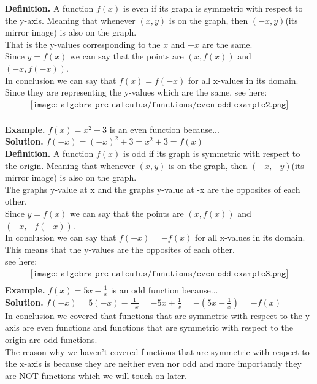 \textbf{Definition.} A function $f(x)$ is even if its graph is symmetric with respect to the y-axis. Meaning that whenever $(x,y)$ is on the graph, then $(-x,y)$(its mirror image) is also on the graph. \\
That is the y-values corresponding to the $x$ and $-x$ are the same. \\
Since $y = f(x)$ we can say that the points are $(x,f(x))$ and $(-x,f(-x))$. \\
In conclusion  we can say that $f(x) = f(-x)$ for all x-values in its domain. Since they are representing the y-values which are the same. 
see here: 
\begin{align*}
	\texttt{[image: algebra-pre-calculus/functions/even\_odd\_example2.png]} \\
\end{align*}

\textbf{Example.} $f(x) = x^2+3$ is an even function because... \\
\textbf{Solution.} $f(-x) = (-x)^2+3 = x^2+3 = f(x)$ \\

\textbf{Definition.} A function $f(x)$ is odd if its graph is symmetric with respect to the origin. Meaning that whenever $(x,y)$ is on the graph, then $(-x,-y)$(its mirror image) is also on the graph. \\
The graphs y-value at x and the graphs y-value at -x are the opposites of each other. \\
Since $y = f(x)$ we can say that the points are $(x,f(x))$ and $(-x,-f(-x))$. \\
In conclusion  we can say that $f(-x) = -f(x)$ for all x-values in its domain. This means that the y-values are the opposites of each other. \\
see here:
\begin{align*}
	\texttt{[image: algebra-pre-calculus/functions/even\_odd\_example3.png]} \\
\end{align*}
\textbf{Example.} $f(x) = 5x-\frac{1}{x}$ is an odd function because... \\
\textbf{Solution.} $f(-x) = 5(-x)-\frac{1}{-x} = -5x+\frac{1}{x} = -(5x-\frac{1}{x}) = -f(x)$ \\

In conclusion we covered that functions that are symmetric with respect to the y-axis are even functions and functions that are symmetric with respect to the origin are odd functions. \\
The reason why we haven't covered functions that are symmetric with respect to the x-axis is because they are neither even nor odd and more importantly they are NOT functions which we will touch on later. \\